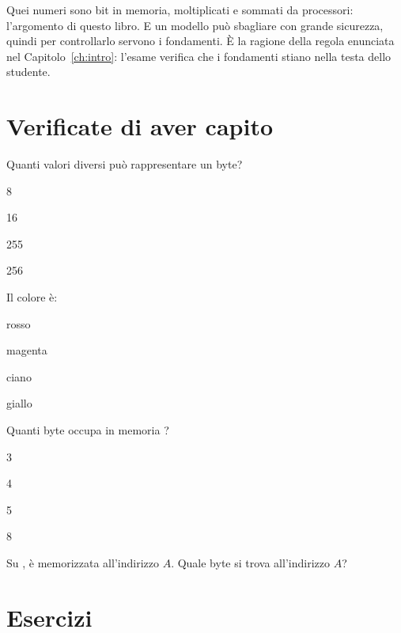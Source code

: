 Quei numeri sono bit in memoria, moltiplicati e sommati da processori:
l'argomento di questo libro. E un modello può sbagliare con grande sicurezza,
quindi per controllarlo servono i fondamenti. È la ragione della regola
enunciata nel Capitolo~\ref{ch:intro}: l'esame verifica che i fondamenti stiano
nella testa dello studente.





\section{Verificate di aver capito}

\begin{quiz}{Quanti valori diversi può rappresentare un byte?}
\item 8
\item 16
\item 255
\item 256
\end{quiz}

\begin{quiz}{Il colore \prg {} è:}
\item rosso
\item magenta
\item ciano
\item giallo
\end{quiz}

\begin{quiz}{Quanti byte occupa in memoria ?}
\item 3
\item 4
\item 5
\item 8
\end{quiz}

\begin{quiz}{Su \riscv,  è memorizzata all'indirizzo $A$. Quale byte si trova all'indirizzo $A$?}
\item {}
\item {}
\item {}
\item {}
\end{quiz}

\section{Esercizi}


